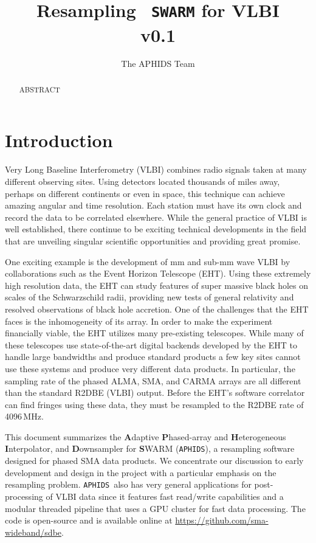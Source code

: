 \documentclass[11pt,preprint]{aastex}
\newcommand{\SWARM}[1]{\texttt{#1\,SWARM}}
\newcommand{\APHIDS}{\texttt{APHIDS}}
\begin{document}
\title{Resampling \SWARM{} for VLBI \\ v0.1}

\author{The APHIDS Team}

\begin{abstract}
ABSTRACT
\end{abstract}

\section{Introduction}

Very Long Baseline Interferometry (VLBI) combines radio signals taken at many different observing sites.  Using
detectors located thousands of miles away, perhaps on different continents or even in space,
this technique can achieve amazing angular and time resolution.  Each station must have its own clock and record 
the data to be correlated elsewhere.  While the general practice of VLBI is well established, there continue to 
be exciting technical developments in the field that are unveiling singular scientific opportunities 
and providing great promise.

One exciting example is the development of mm and sub-mm wave VLBI by collaborations such as the Event Horizon
Telescope (EHT).  Using these extremely high resolution data, the EHT can study features of 
super massive black holes on scales of the Schwarzschild radii, providing new tests of general relativity and 
resolved observations of black hole accretion.  One of the challenges that the EHT faces is the inhomogeneity 
of its array.  In order to make the experiment financially viable, the EHT utilizes many pre-existing telescopes.
While many of these telescopes use state-of-the-art digital backends developed by the EHT to handle large 
bandwidths and produce standard products a few key sites cannot use these systems and produce very 
different data products. In particular, the sampling rate of the phased ALMA, SMA, and CARMA arrays are all 
different than the standard R2DBE (VLBI) output.  Before the EHT's software correlator
\citep[DIFX][]{deller09} can find fringes using these data, they must be resampled to the R2DBE rate of 
4096\,MHz.  

This document summarizes the \textbf{A}daptive \textbf{P}hased-array and \textbf{H}eterogeneous 
\textbf{I}nterpolator, and \textbf{D}ownsampler for \textbf{S}WARM (\APHIDS), a resampling software designed for 
phased SMA data products.  We concentrate our discussion to early development and design in the project with 
a particular emphasis on the resampling problem.  \APHIDS\, also has very general applications for 
post-processing of VLBI data since it features fast read/write capabilities and a modular threaded pipeline 
that uses a GPU cluster for fast data processing.  The code is open-source and is available online at 
\url{https://github.com/sma-wideband/sdbe}.
\end{document}
